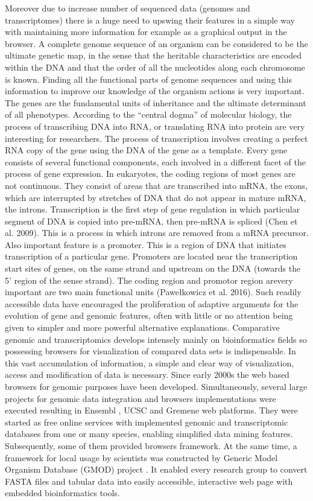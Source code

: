 \documentclass[a4paper]{spie}
\begin{document}
Moreover due to increase  number of sequenced data  (genomes and transcriptomes) there is a huge need to upswing their features in a simple way with maintaining more information for example as a graphical output in the browser. A complete genome sequence of an organism can be considered to be the ultimate genetic map, in the sense that the heritable characteristics are encoded within the DNA and that the order of all the nucleotides along each chromosome is known. Finding all the functional parts of genome sequences and using this information to improve our knowledge of the  organism actions is very important. The genes are the fundamental units of inheritance and the ultimate determinant of all phenotypes. According to the “central dogma” of molecular biology, the process of transcribing DNA into RNA, or translating RNA into protein are very interesting for  researchers. The process of transcription involves creating a perfect RNA copy of the gene using the DNA of the gene as a template. Every gene consists of several functional components, each involved in a different facet of the process of gene expression. In eukaryotes, the coding regions of most genes are not continuous. They consist of areas that are transcribed into mRNA, the exons, which are interrupted by stretches of DNA that do not appear in mature mRNA, the introns. Transcription is the first step of gene regulation in which particular segment of DNA is copied into pre-mRNA, then pre-mRNA is spliced (Chen et al. 2009). This is a process in which introns are removed from a mRNA precursor. Also important feature is a promoter. This is a region of DNA that initiates transcription of a particular gene. Promoters are located near the transcription start sites of genes, on the same strand and upstream on the DNA (towards the 5' region of the sense strand). The coding region and promotor region arevery important are two main functional units (Pawełkowicz et al. 2016).
Such readily accessible data have encouraged the proliferation of adaptive arguments for the evolution of gene and genomic features, often with little or no attention being given to simpler and more powerful alternative explanations. Comparative genomic and transcriptomics develops intensely mainly on bioinformatics fields so possessing browsers for visualization of compared data sets is indispensable. 
In this vast accumulation of information,
a simple and clear way of visualization, access and modification of data is necessary.
Since early 2000s the web based browsers for genomic purposes have been developed.
Simultaneously, several large projects for genomic data integration and browsers implementations were executed
resulting in Ensembl \cite{hubbard2002ensembl}, UCSC \cite{karolchik2003ucsc} and Gremene \cite{ware2002gramene} web platforms.
They were started as free online services with implemented genomic and transcriptomic databases from one or many species,
enabling simplified data mining features.
Subsequently, some of them provided browsers framework.
At the same time, a framework for local usage by scientists was constructed by Generic Model Organism Database (GMOD) project \cite{stein2002generic}.
It enabled every research group to convert FASTA files and tabular data into easily accessible, interactive web page with embedded bioinformatics tools.
\end{document}
